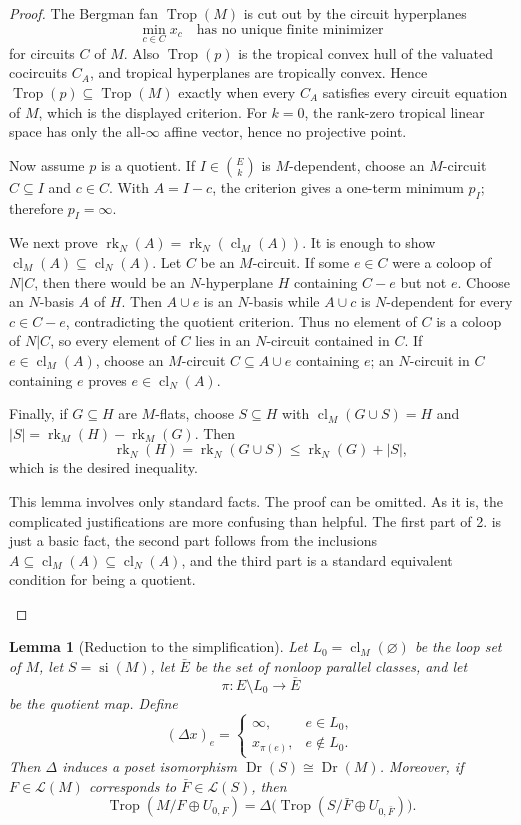 \documentclass[12pt]{article}
\newtheorem{lemma}[theorem]{Lemma}
\theoremstyle{definition}
\newcommand{\Trop}{\operatorname{Trop}}
\newcommand{\Dr}{\operatorname{Dr}}
\newcommand{\rk}{\operatorname{rk}}
\newcommand{\cl}{\operatorname{cl}}
\newcommand{\cL}{\mathcal L}
\newcommand{\binomE}[1]{\binom{E}{#1}}
\newcommand{\review}[1]{\begin{reviewbox}#1\end{reviewbox}}
\begin{document}
\begin{proof}
The Bergman fan \(\Trop(M)\) is cut out by the circuit hyperplanes
\[
\min_{c\in C}x_c\quad\text{has no unique finite minimizer}
\]
for circuits \(C\) of \(M\).  Also \(\Trop(p)\) is the tropical convex hull of the valuated cocircuits \(C_A\), and tropical hyperplanes are tropically convex.  Hence \(\Trop(p)\subseteq\Trop(M)\) exactly when every \(C_A\) satisfies every circuit equation of \(M\), which is the displayed criterion.  For \(k=0\), the rank-zero tropical linear space has only the all-\(\infty\) affine vector, hence no projective point.

Now assume \(p\) is a quotient.  If \(I\in\binomE{k}\) is \(M\)-dependent, choose an \(M\)-circuit \(C\subseteq I\) and \(c\in C\).  With \(A=I-c\), the criterion gives a one-term minimum \(p_I\); therefore \(p_I=\infty\).

We next prove \(\rk_N(A)=\rk_N(\cl_M(A))\).  It is enough to show \(\cl_M(A)\subseteq\cl_N(A)\).  Let \(C\) be an \(M\)-circuit.  If some \(e\in C\) were a coloop of \(N|C\), then there would be an \(N\)-hyperplane \(H\) containing \(C-e\) but not \(e\).  Choose an \(N\)-basis \(A\) of \(H\).  Then \(A\cup e\) is an \(N\)-basis while \(A\cup c\) is \(N\)-dependent for every \(c\in C-e\), contradicting the quotient criterion.  Thus no element of \(C\) is a coloop of \(N|C\), so every element of \(C\) lies in an \(N\)-circuit contained in \(C\).  If \(e\in\cl_M(A)\), choose an \(M\)-circuit \(C\subseteq A\cup e\) containing \(e\); an \(N\)-circuit in \(C\) containing \(e\) proves \(e\in\cl_N(A)\).

Finally, if \(G\subseteq H\) are \(M\)-flats, choose \(S\subseteq H\) with \(\cl_M(G\cup S)=H\) and \(|S|=\rk_M(H)-\rk_M(G)\).  Then
\[
\rk_N(H)=\rk_N(G\cup S)\le \rk_N(G)+|S|,
\]
which is the desired inequality.
\review{This lemma involves only standard facts. The proof can be omitted. As it is, the complicated justifications are more confusing than helpful. The first part of 2. is just a basic fact, the second part follows from the inclusions 
$A \subseteq \cl_M(A) \subseteq \cl_N(A)$, and the third part is a standard equivalent condition for being a quotient.}
\end{proof}

\begin{lemma}[Reduction to the simplification]\label{lem:simplification}
Let \(L_0=\cl_M(\varnothing)\) be the loop set of \(M\), let \(S=\operatorname{si}(M)\), let \(\bar E\) be the set of nonloop parallel classes, and let
\[
\pi:E\setminus L_0\to \bar E
\]
be the quotient map.  Define
\[
(\Delta x)_e=
\begin{cases}
\infty,& e\in L_0,\\
x_{\pi(e)},& e\notin L_0.
\end{cases}
\]
Then \(\Delta\) induces a poset isomorphism \(\Dr(S)\cong \Dr(M)\).  Moreover, if \(F\in\cL(M)\) corresponds to \(\bar F\in\cL(S)\), then
\[
\Trop(M/F\oplus U_{0,F})
=
\Delta\bigl(\Trop(S/\bar F\oplus U_{0,\bar F})\bigr).
\]
\end{lemma}
\end{document}
